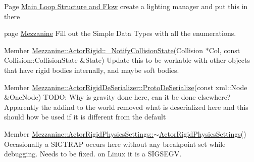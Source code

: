 \label{todo__todo000043}
\hypertarget{todo__todo000043}{}
 
\begin{DoxyDescription}
\item[Page \hyperlink{mainloop1}{Main Loop Structure and Flow} ]create a lighting manager and put this in there 
\end{DoxyDescription}

\label{todo__todo000044}
\hypertarget{todo__todo000044}{}
 
\begin{DoxyDescription}
\item[page \hyperlink{index}{Mezzanine} ]Fill out the Simple Data Types with all the enumerations.
\end{DoxyDescription}

\label{todo__todo000002}
\hypertarget{todo__todo000002}{}
 
\begin{DoxyDescription}
\item[Member \hyperlink{classMezzanine_1_1ActorRigid_a68827280395bc3b9e0266710ec44247d}{Mezzanine::ActorRigid::\_\-NotifyCollisionState}(Collision $\ast$Col, const Collision::CollisionState \&State) ]Update this to be workable with other objects that have rigid bodies internally, and maybe soft bodies. 
\end{DoxyDescription}

\label{todo__todo000003}
\hypertarget{todo__todo000003}{}
 
\begin{DoxyDescription}
\item[Member \hyperlink{classMezzanine_1_1ActorRigidDeSerializer_aff6fdcd7d7fdbc52e493ba2c8229b2e1}{Mezzanine::ActorRigidDeSerializer::ProtoDeSerialize}(const xml::Node \&OneNode) ]TODO: Why is gravity done here, can it be done elsewhere? Apparently the addind to the world removed what is deserialized here and this should how be used if it is different from the default 
\end{DoxyDescription}

\label{todo__todo000001}
\hypertarget{todo__todo000001}{}
 
\begin{DoxyDescription}
\item[Member \hyperlink{classMezzanine_1_1ActorRigidPhysicsSettings_a56d106b78dfa0ea5415c7928491e4fa7}{Mezzanine::ActorRigidPhysicsSettings::$\sim$ActorRigidPhysicsSettings}() ]Occasionally a SIGTRAP occurs here without any breakpoint set while debugging. Needs to be fixed. on Linux it is a SIGSEGV. 
\end{DoxyDescription}

